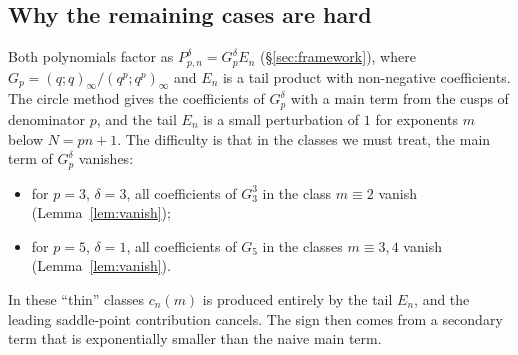 \subsection{Why the remaining cases are hard}
Both polynomials factor as $P_{p,n}^\delta=G_p^\delta E_n$ (\S\ref{sec:framework}), where $G_p=(q;q)_\infty/(q^p;q^p)_\infty$
and $E_n$ is a tail product with non-negative coefficients. The circle method gives the coefficients of $G_p^\delta$ with a
main term from the cusps of denominator $p$, and the tail $E_n$ is a small perturbation of $1$ for exponents $m$ below
$N=pn+1$. The difficulty is that in the classes we must treat, the main term of $G_p^\delta$ vanishes:
\begin{itemize}
\item for $p=3$, $\delta=3$, all coefficients of $G_3^3$ in the class $m\equiv2$ vanish (Lemma~\ref{lem:vanish});
\item for $p=5$, $\delta=1$, all coefficients of $G_5$ in the classes $m\equiv3,4$ vanish (Lemma~\ref{lem:vanish}).
\end{itemize}
In these ``thin'' classes $c_n(m)$ is produced entirely by the tail $E_n$, and the leading saddle-point contribution
cancels. The sign then comes from a secondary term that is exponentially smaller than the naive main term.

